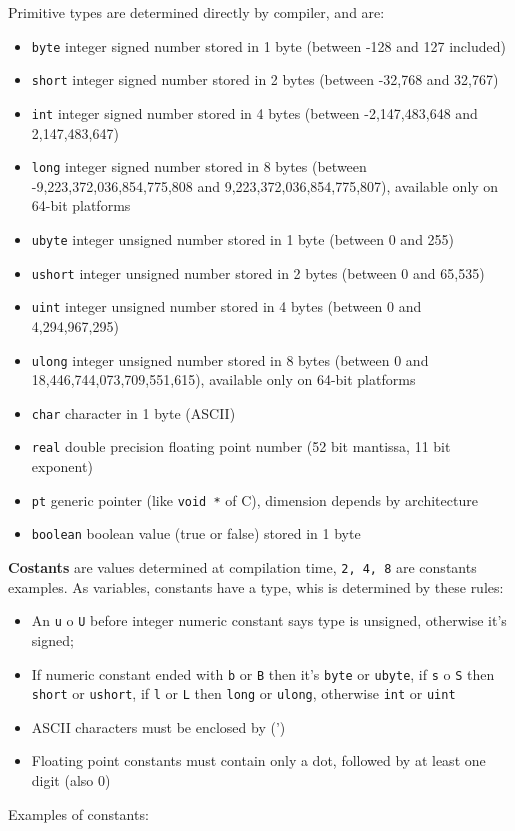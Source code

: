 \documentclass[10pt]{book}%
\newcommand{\code}[1]{\texttt{#1}}
\renewcommand{\emph}[1]{\textbf{#1}}
\begin{document}
Primitive types are determined directly by compiler, and are:
\begin{itemize}
\item \code{byte} integer signed number stored in 1 byte (between -128 and 127 included)
\item \code{short} integer signed number stored in 2 bytes (between -32,768 and 32,767)
\item \code{int} integer signed number stored in 4 bytes (between -2,147,483,648 and 2,147,483,647)
\item \code{long} integer signed number stored in 8 bytes (between \\ -9,223,372,036,854,775,808 and 9,223,372,036,854,775,807), available only on 64-bit platforms
\item \code{ubyte} integer unsigned number stored in 1 byte (between 0 and 255)
\item \code{ushort} integer unsigned number stored in 2 bytes (between 0 and 65,535)
\item \code{uint} integer unsigned number stored in 4 bytes (between 0 and \\ 4,294,967,295)
\item \code{ulong} integer unsigned number stored in 8 bytes (between 0 and \\ 18,446,744,073,709,551,615), available only on 64-bit platforms
\item \code{char} character in 1 byte (ASCII)
\item \code{real} double precision floating point number (52 bit mantissa, 11 bit exponent)
\item \code{pt} generic pointer (like \code{void *} of C), dimension depends by architecture
\item \code{boolean} boolean value (true or false) stored in 1 byte
\end{itemize}

\emph{Costants} are values determined at compilation time, \code{2, 4, 8} are constants examples. As variables, constants have a type, whis is determined by these rules:
\begin{itemize}
\item An \code u o \code U before integer numeric constant says type is unsigned, otherwise it's signed;
\item If numeric constant ended with \code b or \code B then it's \code{byte} or \code{ubyte}, if \code s o \code S then \code{short} or \code{ushort}, if \code l or \code L then \code{long} or \code{ulong}, otherwise \code{int} or \code{uint}
\item ASCII characters must be enclosed by  (')
\item Floating point constants must contain only a dot, followed by at least one digit (also 0) 
\end{itemize}
Examples of constants:
\end{document}
